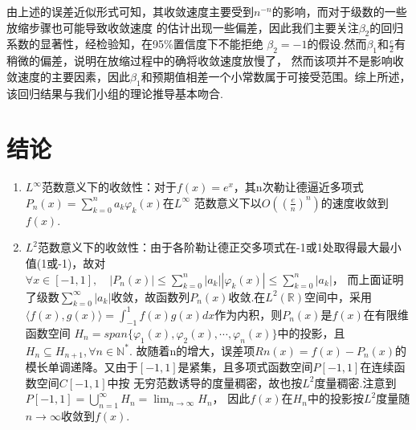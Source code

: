 \documentclass{article}
\begin{document}
    由上述的误差近似形式可知，其收敛速度主要受到$n^{-n}$的影响，而对于级数的一些放缩步骤也可能导致收敛速度
    的估计出现一些偏差，因此我们主要关注$\beta_2$的回归系数的显著性，经检验知，在95\%置信度下不能拒绝
    $\beta_2=-1$的假设.然而$\beta_1$和$\frac{e}{2}$有稍微的偏差，说明在放缩过程中的确将收敛速度放慢了，
    然而该项并不是影响收敛速度的主要因素，因此$\beta_1$和预期值相差一个小常数属于可接受范围。综上所述，
    该回归结果与我们小组的理论推导基本吻合.\\

    \section{结论}
    \begin{enumerate}
        \item $L^{\infty}$范数意义下的收敛性：对于$f(x)=e^x$，其n次勒让德逼近多项式$P_n(x)=\sum_{k=0}^{n} a_k\varphi_k(x)$在$L^{\infty}$
        范数意义下以$O((\frac{e}{n})^n)$的速度收敛到$f(x)$.\\
        \item $L^2$范数意义下的收敛性：由于各阶勒让德正交多项式在-1或1处取得最大最小值(1或-1)，故对$\forall x\in [-1,1],\quad 
        |P_n(x)|\leqslant \sum_{k=0}^{n}|a_k||\varphi_k(x)| \leqslant \sum_{k=0}^{n}|a_k|$， 
        而上面证明了级数$\sum_{k=0}^{\infty}|a_k|$收敛，故函数列${P_n(x)}$收敛.在$L^2(\mathbb{R})$空间中，采用
        $\langle f(x),g(x) \rangle = \int_{-1}^{1}f(x)g(x)dx$作为内积，则$P_n(x)$是$f(x)$在有限维函数空间
        $H_n=span\{\varphi_1(x),\varphi_2(x),\cdots,\varphi_n(x)\}$中的投影，且$H_n\subseteq H_{n+1}, \forall n\in \mathbb{N^*}$.
        故随着n的增大，误差项$Rn(x)=f(x)-P_n(x)$的模长单调递降。又由于$[-1,1]$是紧集，且多项式函数空间$P[-1,1]$在连续函数空间$C[-1,1]$中按
        无穷范数诱导的度量稠密，故也按$L^2$度量稠密.注意到$P[-1,1]=\mathop{\bigcup}\limits_{n=1}^{\infty}H_n=\lim_{n \to \infty} H_n $，
        因此$f(x)$在$H_n$中的投影按$L^2$度量随$n \to \infty$收敛到$f(x)$.
    \end{enumerate}   
\end{document}

